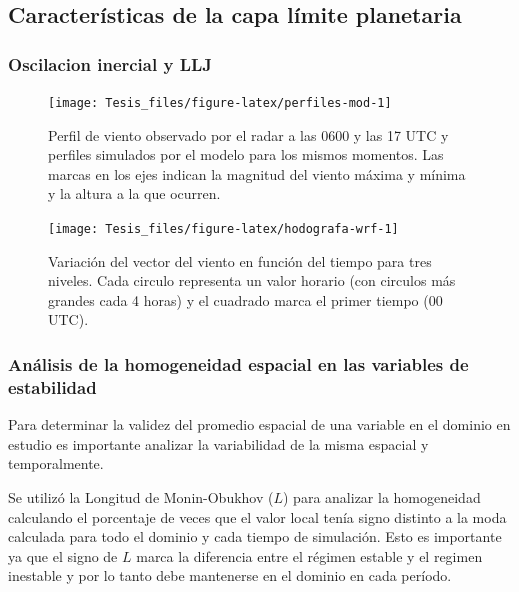 \documentclass[12pt,spanish,oneside]{book}
\begin{document}
\subsection{Características de la capa límite
planetaria}\label{caracteristicas-de-la-capa-limite-planetaria-1}

\subsubsection{Oscilacion inercial y
LLJ}\label{oscilacion-inercial-y-llj-1}

\begin{figure}

{\centering \texttt{[image: Tesis\_files/figure-latex/perfiles-mod-1]} 

}

\caption{Perfil de viento observado por el radar a las 0600 y las 17 UTC y perfiles simulados por el modelo para los mismos momentos. Las marcas en los ejes indican la magnitud del viento máxima y mínima y la altura a la que ocurren. \label{perfiles-modelo}}\label{fig:perfiles-mod}
\end{figure}

\begin{figure}

{\centering \texttt{[image: Tesis\_files/figure-latex/hodografa-wrf-1]} 

}

\caption{Variación del vector del viento en función del tiempo para tres niveles. Cada circulo representa un valor horario (con circulos más grandes cada 4 horas) y el cuadrado marca el primer tiempo (00 UTC). \label{hodografa-wrf}}\label{fig:hodografa-wrf}
\end{figure}

\subsubsection{Análisis de la homogeneidad espacial en las variables de
estabilidad}\label{analisis-de-la-homogeneidad-espacial-en-las-variables-de-estabilidad}

Para determinar la validez del promedio espacial de una variable en el
dominio en estudio es importante analizar la variabilidad de la misma
espacial y temporalmente.

Se utilizó la Longitud de Monin-Obukhov (\(L\)) para analizar la
homogeneidad calculando el porcentaje de veces que el valor local tenía
signo distinto a la moda calculada para todo el dominio y cada tiempo de
simulación. Esto es importante ya que el signo de \(L\) marca la
diferencia entre el régimen estable y el regimen inestable y por lo
tanto debe mantenerse en el dominio en cada período.
\end{document}
